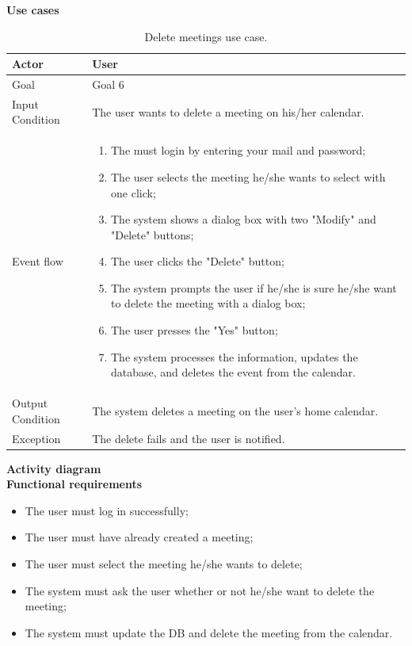 \documentclass{article}
\begin{document}
	\bigskip
	\noindent
	\textbf{Use cases} \\
	
	\begin{table}[htp]
	\caption{Delete meetings use case.}
		\begin{center}
    			\begin{tabular}{p{}|p{}}
   			 	\hline
    				Actor & User \\ \hline
    				Goal & Goal 6 \\ \hline
    				Input Condition & The user wants to delete a meeting on his/her calendar. \\ \hline
    				Event flow & 
				\begin{enumerate}
  					\item The must login by entering your mail and password;
  					\item The user selects the meeting he/she wants to select with one click;
  					\item The system shows a dialog box with two "Modify" and "Delete" buttons;
  					\item The user clicks the "Delete" button;
  					\item The system prompts the user if he/she is sure he/she want to delete the meeting with a dialog box;
  					\item The user presses the "Yes" button;
  					\item The system processes the information, updates the database, and deletes the event from the calendar.
 				 \end{enumerate} \\ \hline
    				Output Condition & The system deletes a meeting on the user's home calendar. \\ \hline
    				Exception & The delete fails and the user is notified. \\ \hline
    			\end{tabular}
		\end{center}
	\end{table}
	
	\bigskip
	\noindent
	\textbf{Activity diagram} \\
	
	
	\bigskip
	\noindent
	\textbf{Functional requirements} \\
	\begin{itemize}
		\item The user must log in successfully;
		\item The user must have already created a meeting;
		\item The user must select the meeting he/she wants to delete;
		\item The system must ask the user whether or not he/she want to delete the meeting;
		\item The system must update the DB and delete the meeting from the calendar.
	\end{itemize}
\end{document}
